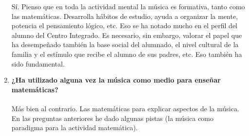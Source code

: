 \documentclass[a4paper, openright, 11pt, titlepage]{report}
\theoremstyle{definition}\newtheorem{defin}[propo]{Definition}
\theoremstyle{definition}\newtheorem{obser}[propo]{Remark}
\theoremstyle{definition}\newtheorem{ejem}[propo]{Ejemplo}
\theoremstyle{definition}\newtheorem{algoritmo}[propo]{Algoritmo}
\begin{document}
\begin{enumerate}
    Sí. Pienso que en toda la actividad mental la música es formativa, tanto como las matemáticas. Desarrolla hábitos de estudio, ayuda a organizar la mente, potencia el pensamiento lógico, etc. Eso se ha notado mucho en el perfil del alumno del Centro Integrado. Es necesario, sin embargo, valorar el papel que ha desempeñado también la base social del alumnado, el nivel cultural de la familia y el estímulo que recibe el alumno de sus padres, etc. Eso también ha sido fundamental.
    \item \textbf{¿Ha utilizado alguna vez la música como medio para enseñar matemáticas?}\\\\
    Más bien al contrario. Las matemáticas para explicar aspectos de la música. En las preguntas anteriores he dado algunas pistas (la música como paradigma para la actividad matemática).
\end{enumerate}
\end{document}
